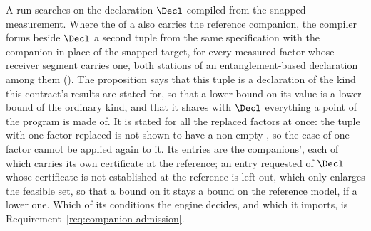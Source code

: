 
A run searches on the declaration $\Decl$ compiled from the snapped
measurement. Where the  of a  also
carries the reference companion, the compiler forms beside $\Decl$ a second
tuple from the same specification with the companion in place of the snapped
target, for every measured factor whose receiver segment carries one, both
stations of an entanglement-based declaration among them
(). The proposition
says that this tuple is a declaration of the kind this contract's results are
stated for, so that a lower bound on its value is a lower bound of the
ordinary kind, and that it shares with $\Decl$ everything a point of the
program is made of. It is stated for all the replaced factors at once: the
tuple with one factor replaced is not shown to have a non-empty
, so the case of one factor cannot be applied again to it.
Its entries are the companions', each of which carries its own certificate at
the reference; an entry requested of $\Decl$ whose certificate is not
established at the reference is left out, which only enlarges the feasible
set, so that a bound on it stays a bound on the reference model, if a lower
one. Which of its conditions the engine decides, and which it imports, is
Requirement~\ref{req:companion-admission}.

